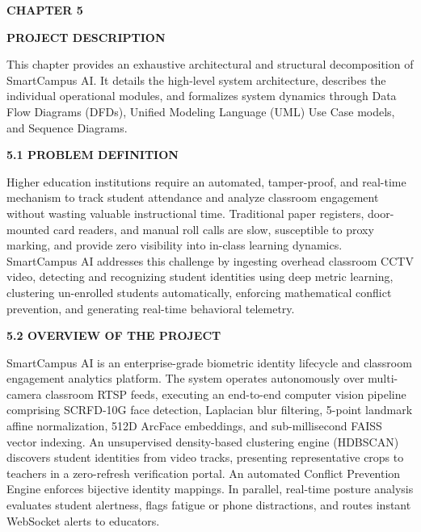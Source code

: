\newpage
\begin{flushleft}
{\fontsize{16pt}{16pt}\selectfont \textbf{CHAPTER 5}}
\end{flushleft}		
\begin{center}
{\fontsize{18pt}{22pt}\selectfont \textbf{PROJECT DESCRIPTION}}\\[2mm]
\end{center}

\onehalfspacing
\justifying
\noindent This chapter provides an exhaustive architectural and structural decomposition of SmartCampus AI. It details the high-level system architecture, describes the individual operational modules, and formalizes system dynamics through Data Flow Diagrams (DFDs), Unified Modeling Language (UML) Use Case models, and Sequence Diagrams.

\vspace{0.2in}
\begin{flushleft}
{\fontsize{14pt}{18pt}\selectfont \textbf{5.1 PROBLEM DEFINITION}}\\[2mm]
\end{flushleft}

\noindent Higher education institutions require an automated, tamper-proof, and real-time mechanism to track student attendance and analyze classroom engagement without wasting valuable instructional time. Traditional paper registers, door-mounted card readers, and manual roll calls are slow, susceptible to proxy marking, and provide zero visibility into in-class learning dynamics. SmartCampus AI addresses this challenge by ingesting overhead classroom CCTV video, detecting and recognizing student identities using deep metric learning, clustering un-enrolled students automatically, enforcing mathematical conflict prevention, and generating real-time behavioral telemetry.

\vspace{0.2in}
\begin{flushleft}
{\fontsize{14pt}{18pt}\selectfont \textbf{5.2 OVERVIEW OF THE PROJECT}}\\[2mm]
\end{flushleft}

\noindent SmartCampus AI is an enterprise-grade biometric identity lifecycle and classroom engagement analytics platform. The system operates autonomously over multi-camera classroom RTSP feeds, executing an end-to-end computer vision pipeline comprising SCRFD-10G face detection, Laplacian blur filtering, 5-point landmark affine normalization, 512D ArcFace embeddings, and sub-millisecond FAISS vector indexing. An unsupervised density-based clustering engine (HDBSCAN) discovers student identities from video tracks, presenting representative crops to teachers in a zero-refresh verification portal. An automated Conflict Prevention Engine enforces bijective identity mappings. In parallel, real-time posture analysis evaluates student alertness, flags fatigue or phone distractions, and routes instant WebSocket alerts to educators.

